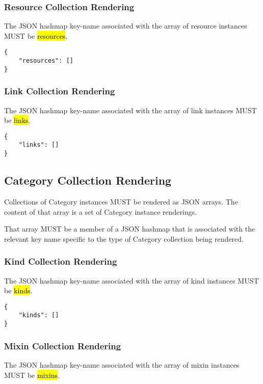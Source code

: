 \documentclass[10pt,a4paper]{article}
\begin{document}
\subsubsection{Resource Collection Rendering}

The JSON hashmap key-name associated with the array of resource instances MUST be \hl{resources}.

\begin{lstlisting}
{
    "resources": []
}
\end{lstlisting}

\subsubsection{Link Collection Rendering}

The JSON hashmap key-name associated with the array of link instances MUST be \hl{links}.

\begin{lstlisting}
{
    "links": []
}
\end{lstlisting}

\subsection{Category Collection Rendering}
Collections of Category instances MUST be rendered as JSON arrays. The content of that array is a set of Category instance renderings.

That array MUST be a member of a JSON hashmap that is associated with the relevant key name specific to the type of Category collection being rendered.


\subsubsection{Kind Collection Rendering}

The JSON hashmap key-name associated with the array of kind instances MUST be \hl{kinds}.

\begin{lstlisting}
{
    "kinds": []
}
\end{lstlisting}

\subsubsection{Mixin Collection Rendering}

The JSON hashmap key-name associated with the array of mixin instances MUST be \hl{mixins}.
\end{document}
